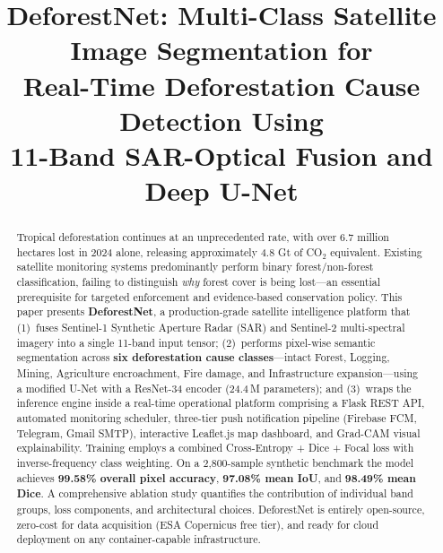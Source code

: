 \documentclass[10pt,conference]{IEEEtran}
\begin{document}

\title{\textbf{DeforestNet: Multi-Class Satellite Image Segmentation for\\
Real-Time Deforestation Cause Detection Using\\
11-Band SAR-Optical Fusion and Deep U-Net}}

\author{%
}

\maketitle

\begin{abstract}
Tropical deforestation continues at an unprecedented rate, with over 6.7 million
hectares lost in 2024 alone, releasing approximately 4.8 Gt of CO$_2$ equivalent.
Existing satellite monitoring systems predominantly perform binary
forest/non-forest classification, failing to distinguish \emph{why} forest cover
is being lost---an essential prerequisite for targeted enforcement and
evidence-based conservation policy. This paper presents \textbf{DeforestNet}, a
production-grade satellite intelligence platform that (1)~fuses Sentinel-1
Synthetic Aperture Radar (SAR) and Sentinel-2 multi-spectral imagery into a
single 11-band input tensor; (2)~performs pixel-wise semantic segmentation across
\textbf{six deforestation cause classes}---intact Forest, Logging, Mining,
Agriculture encroachment, Fire damage, and Infrastructure expansion---using a
modified U-Net with a ResNet-34 encoder (24.4\,M parameters); and (3)~wraps the
inference engine inside a real-time operational platform comprising a Flask REST
API, automated monitoring scheduler, three-tier push notification pipeline
(Firebase FCM, Telegram, Gmail SMTP), interactive Leaflet.js map dashboard, and
Grad-CAM visual explainability. Training employs a combined Cross-Entropy + Dice
+ Focal loss with inverse-frequency class weighting. On a 2,800-sample synthetic
benchmark the model achieves \textbf{99.58\% overall pixel accuracy},
\textbf{97.08\% mean IoU}, and \textbf{98.49\% mean Dice}. A comprehensive
ablation study quantifies the contribution of individual band groups, loss
components, and architectural choices. DeforestNet is entirely open-source,
zero-cost for data acquisition (ESA Copernicus free tier), and ready for
cloud deployment on any container-capable infrastructure.
\end{abstract}
\end{document}
